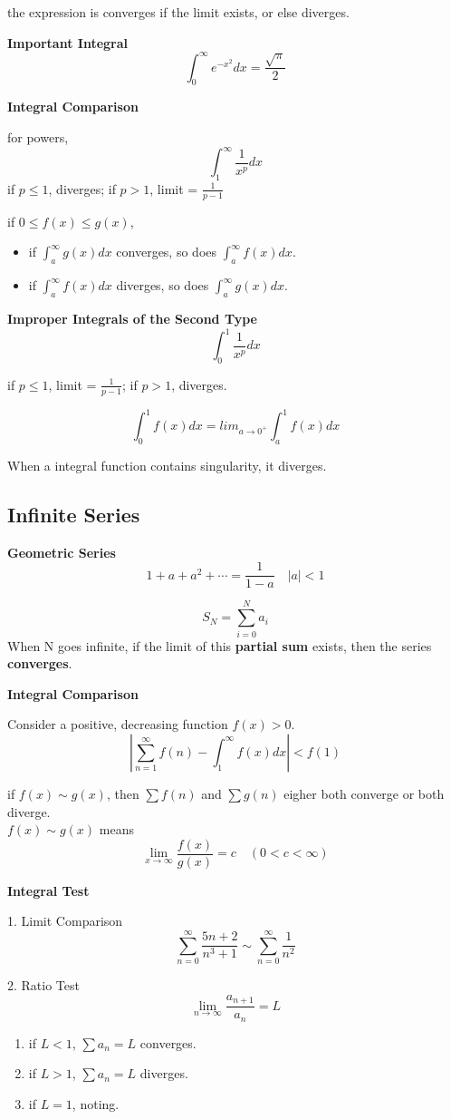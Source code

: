 \documentclass{article}
\newcommand\limitx[1]{\lim_{x \to #1}}
\newcommand\improperint[1]{\int_{#1}^\infty}
\begin{document}
the expression is converges if the limit exists, or else diverges.

\textbf{Important Integral}
$$\improperint{0}e^{-x^2}dx = \frac{\sqrt{\pi}}{2}$$

\textbf{Integral Comparison}

for powers,
$$\improperint{1}\frac{1}{x^p}dx$$
if $p \le 1$, diverges; if $p > 1$, limit = $\frac{1}{p-1}$

if $0 \le f(x) \le g(x)$,
\begin{itemize}
  \item if $\improperint{a}g(x)dx$ converges, so does $\improperint{a}f(x)dx$.
  \item if $\improperint{a}f(x)dx$ diverges, so does $\improperint{a}g(x)dx$.
\end{itemize}

\textbf{Improper Integrals of the Second Type}
$$\int_0^1\frac{1}{x^p}dx$$

if $p \le 1$, limit = $\frac{1}{p-1}$; if $p > 1$, diverges.

$$\int_0^1f(x)dx = lim_{a \rightarrow 0^+}\int_a^1f(x)dx$$

When a integral function contains singularity, it diverges.

\subsection{Infinite Series}

\textbf{Geometric Series}
$$1 + a + a^2 + \cdots = \frac{1}{1-a} \quad |a| < 1$$

$$S_N = \sum\limits_{i=0}^{N}a_i$$
When N goes infinite, if the limit of this \textbf{partial sum} exists, then the series \textbf{converges}.

\textbf{Integral Comparison}

Consider a positive, decreasing function $f(x) > 0$.
$$|\sum\limits_{n=1}^{\infty}f(n) - \improperint{1}f(x)dx| < f(1)$$

if $f(x) \sim g(x)$, then $\sum f(n)$ and $\sum g(n)$ eigher both converge or both diverge. \\
$f(x) \sim g(x)$ means
$$\limitx{\infty}\frac{f(x)}{g(x)} = c \quad (0 < c < \infty)$$

\textbf{Integral Test}

1. Limit Comparison
$$\sum\limits_{n=0}^{\infty}\frac{5n+2}{n^3+1} \sim \sum\limits_{n=0}^{\infty}\frac{1}{n^2}$$

2. Ratio Test
$$\lim_{n \rightarrow \infty}\frac{a_{n+1}}{a_{n}} = L$$
\begin{enumerate}
  \item if $L < 1$, $\sum a_n = L$ converges.
  \item if $L >1 $, $\sum a_n = L$ diverges.
  \item if $L = 1$, noting.
\end{enumerate}
\end{document}
